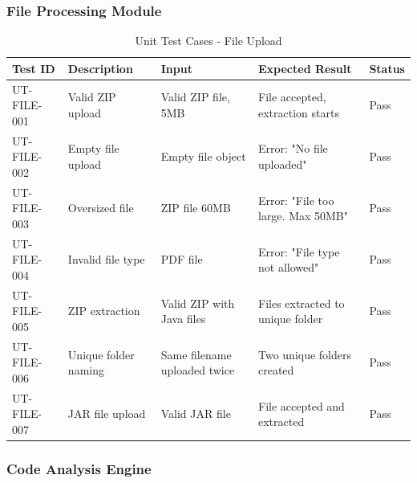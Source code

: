 \documentclass[12pt,a4paper]{article}
\begin{document}
    \subsubsection{File Processing Module}

    \begin{table}[H]
        \caption{Unit Test Cases - File Upload}
        \begin{tabular}{|p{2cm}|p{4cm}|p{3cm}|p{3cm}|p{1.5cm}|}
            \hline
            \textbf{Test ID} & \textbf{Description} & \textbf{Input} & \textbf{Expected Result} & \textbf{Status} \\
            \hline
            UT-FILE-001 & Valid ZIP upload & Valid ZIP file, 5MB & File accepted, extraction starts & Pass \\
            \hline
            UT-FILE-002 & Empty file upload & Empty file object & Error: "No file uploaded" & Pass \\
            \hline
            UT-FILE-003 & Oversized file & ZIP file 60MB & Error: "File too large. Max 50MB" & Pass \\
            \hline
            UT-FILE-004 & Invalid file type & PDF file & Error: "File type not allowed" & Pass \\
            \hline
            UT-FILE-005 & ZIP extraction & Valid ZIP with Java files & Files extracted to unique folder & Pass \\
            \hline
            UT-FILE-006 & Unique folder naming & Same filename uploaded twice & Two unique folders created & Pass \\
            \hline
            UT-FILE-007 & JAR file upload & Valid JAR file & File accepted and extracted & Pass \\
            \hline
        \end{tabular}
    \end{table}

    \subsubsection{Code Analysis Engine}
\end{document}
